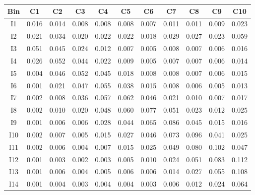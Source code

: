 \begin{tabular}{c@{~~~}c@{~~}c@{~~}c@{~~}c@{~~}c@{~~}c@{~~}c@{~~}c@{~~}c@{~~}c}
\hline 
 \hline 
Bin	& C1 & C2 & C3 & C4 & C5 & C6 & C7 & C8 & C9 & C10 \\ 
\hline 
I1	&  0.016 &  0.014 &  0.008 &  0.008 &  0.008 &  0.007 &  0.011 &  0.011 &  0.009 &  0.023 \\  
I2	&  0.021 &  0.034 &  0.020 &  0.022 &  0.022 &  0.018 &  0.029 &  0.027 &  0.023 &  0.059 \\  
I3	&  0.051 &  0.045 &  0.024 &  0.012 &  0.007 &  0.005 &  0.008 &  0.007 &  0.006 &  0.016 \\  
I4	&  0.026 &  0.052 &  0.044 &  0.022 &  0.009 &  0.005 &  0.007 &  0.007 &  0.006 &  0.014 \\  
I5	&  0.004 &  0.046 &  0.052 &  0.045 &  0.018 &  0.008 &  0.008 &  0.007 &  0.006 &  0.015 \\  
I6	&  0.001 &  0.021 &  0.047 &  0.055 &  0.038 &  0.015 &  0.008 &  0.006 &  0.005 &  0.013 \\  
I7	&  0.002 &  0.008 &  0.036 &  0.057 &  0.062 &  0.046 &  0.021 &  0.010 &  0.007 &  0.017 \\  
I8	&  0.002 &  0.010 &  0.020 &  0.048 &  0.060 &  0.077 &  0.051 &  0.023 &  0.012 &  0.025 \\  
I9	&  0.001 &  0.006 &  0.006 &  0.028 &  0.044 &  0.065 &  0.086 &  0.045 &  0.015 &  0.016 \\  
I10	&  0.002 &  0.007 &  0.005 &  0.015 &  0.027 &  0.046 &  0.073 &  0.096 &  0.041 &  0.025 \\  
I11	&  0.002 &  0.006 &  0.004 &  0.007 &  0.015 &  0.025 &  0.049 &  0.080 &  0.102 &  0.047 \\  
I12	&  0.001 &  0.003 &  0.002 &  0.003 &  0.005 &  0.010 &  0.024 &  0.051 &  0.083 &  0.112 \\  
I13	&  0.001 &  0.006 &  0.004 &  0.005 &  0.006 &  0.006 &  0.014 &  0.027 &  0.055 &  0.108 \\  
I14	&  0.001 &  0.004 &  0.003 &  0.004 &  0.004 &  0.003 &  0.006 &  0.012 &  0.024 &  0.064 \\  
\hline 
 \hline 
\end{tabular}